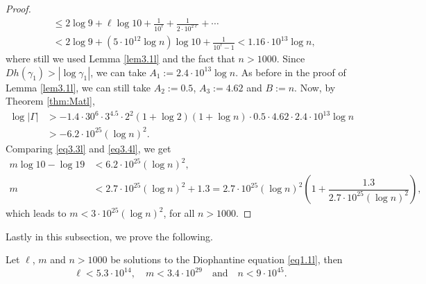 \begin{proof}
\begin{align*}
	&\leq 2\log 9+\ell \log 10  + \frac{1}{10^\ell} + \frac{1}{2 \cdot 10^{2\ell}} + \cdots \\
	&< 2\log 9+ (5 \cdot 10^{12} \log n)\log 10 + \frac{1}{10^\ell - 1} < 1.16 \cdot 10^{13}  \log n,	
\end{align*}
where still we used Lemma \ref{lem3.1l} and the fact that $n>1000$. Since $Dh(\gamma_{1})>|\log \gamma_1 |$, we can take $A_1:=2.4 \cdot 10^{13}  \log n$. As before in the proof of Lemma \ref{lem3.1l}, we can still take $A_2:=0.5$, $A_3:=4.62$ and $B:=n$. Now, by Theorem \ref{thm:Matl},
\begin{align}\label{eq3.4l}
	\log |\Gamma| &> -1.4\cdot 30^{6} \cdot 3^{4.5}\cdot 2^2 (1+\log 2)(1+\log n)\cdot 0.5\cdot 4.62\cdot 2.4 \cdot 10^{13}  \log n\nonumber\\
	&> -6.2\cdot 10^{25}(\log n)^2.
\end{align}
Comparing \eqref{eq3.3l} and \eqref{eq3.4l}, we get
\begin{align*}
	m\log 10-\log 19&<6.2\cdot 10^{25}(\log n)^2,\\
	m&<2.7\cdot 10^{25}(\log n)^2+1.3
	=2.7\cdot 10^{25}(\log n)^2\left(1+\dfrac{1.3}{2.7\cdot 10^{25}(\log n)^2}\right),
\end{align*}
which leads to $m<3\cdot 10^{25}(\log n)^2$, for all $n>1000$.	
\end{proof}
Lastly in this subsection, we prove the following.

\begin{lemma}\label{lem3.3l}
	Let $\ell$, $m$ and $n>1000$ be solutions to the Diophantine equation \eqref{eq1.1l}, then
	$$\ell< 5.3\cdot 10^{14},\quad m<3.4\cdot 10^{29}\quad\text{and}\quad n<9\cdot 10^{45}.$$
\end{lemma}

